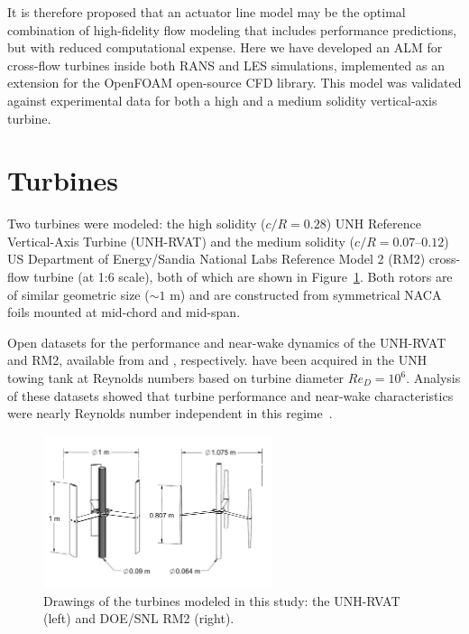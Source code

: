 \documentclass[times]{weauth}
\begin{document}
It is therefore proposed that an actuator line model may be the optimal
combination of high-fidelity flow modeling that includes performance
predictions, but with reduced computational expense. Here we have developed an
ALM for cross-flow turbines inside both RANS and LES simulations, implemented as
an extension for the OpenFOAM open-source CFD library. This model was validated
against experimental data for both a high \cite{Bachant2015-JoT} and a medium
\cite{Bachant2016-RM2-paper} solidity vertical-axis turbine.


\section{Turbines}

Two turbines were modeled: the high solidity ($c/R=0.28$) UNH Reference
Vertical-Axis Turbine (UNH-RVAT) and the medium solidity ($c/R=0.07$--$0.12$) US
Department of Energy/Sandia National Labs Reference Model 2 (RM2) cross-flow
turbine (at 1:6 scale), both of which are shown in Figure~\ref{fig:turbines}.
Both rotors are of similar geometric size ($\sim 1$ m) and are constructed from
symmetrical NACA foils mounted at mid-chord and mid-span.

Open datasets for the performance and near-wake dynamics of the UNH-RVAT and
RM2, available from \cite{Bachant2014-RVAT-baseline,Bachant2016-RVAT-Re-dep} and
\cite{Bachant2016-RM2-data}, respectively. have been acquired in the UNH towing
tank at Reynolds numbers based on turbine diameter $Re_D = 10^6$. Analysis of
these datasets showed that turbine performance and near-wake characteristics
were nearly Reynolds number independent in this
regime~\cite{Bachant2016-Energies,Bachant2016-RM2-paper}.

\begin{figure}
    \centering

    \includegraphics[width=0.6\textwidth]{turbines}

    \caption{Drawings of the turbines modeled in this study: the UNH-RVAT (left)
    and DOE/SNL RM2 (right).}

    \label{fig:turbines}
\end{figure}
\end{document}
